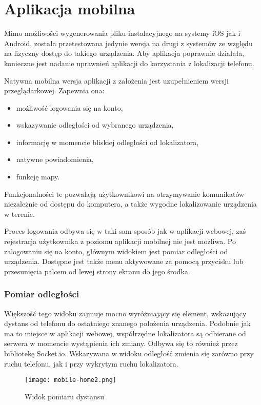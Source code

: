 \documentclass[eng,printmode]{mgr}
\begin{document}
\section{Aplikacja mobilna}
Mimo możliwości wygenerowania pliku instalacyjnego na systemy iOS jak i Android, została przetestowana jedynie wersja na drugi z systemów ze względu na fizyczny dostęp do takiego urządzenia. Aby aplikacja poprawnie działała, konieczne jest nadanie uprawnień aplikacji do korzystania z lokalizacji telefonu.

Natywna mobilna wersja aplikacji z założenia jest uzupełnieniem wersji przeglądarkowej. Zapewnia ona:
\begin{itemize}
\item możliwość logowania się na konto,
\item wskazywanie odległości od wybranego urządzenia,
\item informację w momencie bliskiej odległości od lokalizatora,
\item natywne powiadomienia,
\item funkcję mapy.
\end{itemize}
Funkcjonalności te pozwalają użytkownikowi na otrzymywanie komunikatów niezależnie od dostępu do komputera, a także wygodne lokalizowanie urządzenia w terenie.

Proces logowania odbywa się w taki sam sposób jak w aplikacji webowej, zaś rejestracja użytkownika z poziomu aplikacji mobilnej nie jest możliwa. Po zalogowaniu się na konto, głównym widokiem jest pomiar odległości od urządzenia. Dostępne jest także menu aktywowane za pomocą przycisku lub przesunięcia palcem od lewej strony ekranu do jego środka.

\subsubsection{Pomiar odległości}
Większość tego widoku zajmuje mocno wyróżniający się element, wskazujący dystans od telefonu do ostatniego znanego położenia urządzenia. Podobnie jak ma to miejsce w aplikacji webowej, współrzędne lokalizatora są odbierane od serwera w momencie wystąpienia ich zmiany. Odbywa się to również przez bibliotekę Socket.io. Wskazywana w widoku odległość zmienia się zarówno przy ruchu telefonu, jak i przy wykrytym ruchu lokalizatora. 
\begin{figure}[!hb]
\centering
\texttt{[image: mobile-home2.png]}
\caption{Widok pomiaru dystansu}
\end{figure}
\end{document}
